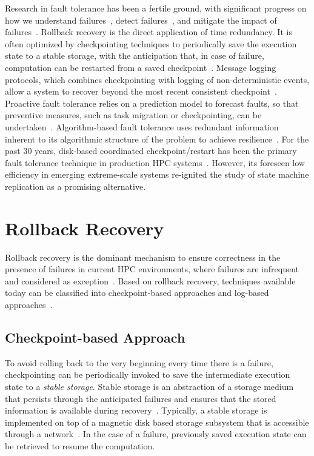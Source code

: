 Research in fault tolerance has been a fertile ground, with significant progress on how we understand failures~\cite{cfdr,Cappello:09:Fault,calhoun2017towards}, detect failures~\cite{bosilca2016failure,fiala_2012_sdc,di2016adaptive}, and mitigate the
impact of failures~\cite{bland2013post,herault2015practical,fang2017letgo}. Rollback recovery is the direct application of time redundancy. It is often optimized by checkpointing techniques to periodically save
the execution state to a stable storage, with the anticipation
that, in case of failure, computation can be restarted from
a saved checkpoint~\cite{chandy_trans_1985}. Message logging protocols, which
combines checkpointing with logging of non-deterministic
events, allow a system to recover beyond the most recent
consistent checkpoint~\cite{strom1985optimistic}. Proactive fault tolerance relies
on a prediction model to forecast faults, so that preventive
measures, such as task migration or checkpointing, can be
undertaken~\cite{6468487,engelmann2009proactive,chakravorty2006proactive,liang2006bluegene}. Algorithm-based fault tolerance
uses redundant information inherent to its algorithmic structure of the problem to achieve resilience~\cite{luk1988analysis,bosilca2009algorithm}. For the past 30
years, disk-based coordinated checkpoint/restart has been the primary fault
tolerance technique in production HPC systems~\cite{ferreira_sc_2011}. However, its foreseen low efficiency in emerging extreme-scale systems re-ignited the study of state machine replication as a promising alternative.




\section{Rollback Recovery}
 
Rollback recovery is the dominant mechanism to ensure correctness in the presence of failures in current HPC environments, where failures are infrequent and considered as exception~\cite{Deconinck93surveyof,Elnozahy:02:Survey,Egwutuoha2013}. Based on rollback recovery, techniques available today can be classified into checkpoint-based approaches and log-based approaches~\cite{Elnozahy:02:Survey}.

\subsection{Checkpoint-based Approach}
To avoid rolling back to the very beginning every time there is a failure, checkpointing can be periodically invoked to save the intermediate execution state to a \textit{stable storage}. Stable storage is an abstraction of a storage medium that persists through the anticipated failures and ensures that the stored information is available during recovery~\cite{Elnozahy:02:Survey}. Typically, a stable storage is implemented on top of a magnetic disk based storage subsystem that is accessible through a network~\cite{silva1998using}. In the case of a failure, previously saved execution state can be retrieved to resume the computation. 

